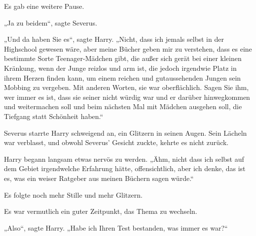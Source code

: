 Es gab eine weitere Pause.

„Ja zu beidem“, sagte Severus.

„Und da haben Sie es“, sagte Harry.
„Nicht, dass ich jemals selbst in der Highschool gewesen wäre, aber meine Bücher geben mir zu verstehen, dass es eine bestimmte Sorte Teenager-Mädchen gibt, die außer sich gerät bei einer kleinen Kränkung, wenn der Junge reizlos und arm ist, die jedoch irgendwie Platz in ihrem Herzen finden kann, um einem reichen und gutaussehenden Jungen sein Mobbing zu vergeben. Mit anderen Worten, sie war oberflächlich. Sagen Sie ihm, wer immer es ist, dass sie seiner nicht würdig war und er darüber hinwegkommen und weitermachen soll und beim nächsten Mal mit Mädchen ausgehen soll, die Tiefgang statt Schönheit haben.“

Severus starrte Harry schweigend an, ein Glitzern in seinen Augen. Sein Lächeln war verblasst, und obwohl Severus’ Gesicht zuckte, kehrte es nicht zurück.

Harry begann langsam etwas nervös zu werden. „Ähm, nicht dass ich selbst auf dem Gebiet irgendwelche Erfahrung hätte, offensichtlich, aber ich denke, das ist es, was ein weiser Ratgeber aus meinen Büchern sagen würde.“

Es folgte noch mehr Stille und mehr Glitzern.

Es war vermutlich ein guter Zeitpunkt, das Thema zu wechseln.

„Also“, sagte Harry.
„Habe ich Ihren Test bestanden, was immer es war?“

